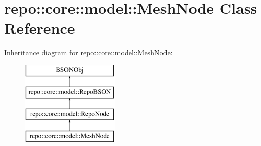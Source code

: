 \hypertarget{classrepo_1_1core_1_1model_1_1_mesh_node}{}\section{repo\+:\+:core\+:\+:model\+:\+:Mesh\+Node Class Reference}
\label{classrepo_1_1core_1_1model_1_1_mesh_node}
Inheritance diagram for repo\+:\+:core\+:\+:model\+:\+:Mesh\+Node\+:\begin{figure}[H]
\begin{center}
\leavevmode
\includegraphics[height=4.000000cm]{classrepo_1_1core_1_1model_1_1_mesh_node}
\end{center}
\end{figure}
